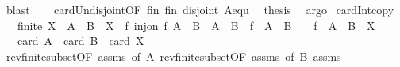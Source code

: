 \begin{isabellebody}
\ blast{\isacharplus}{\kern0pt}\isanewline
\ \ \isamarkupfalse%
\ card{\isacharunderscore}{\kern0pt}Un{\isacharunderscore}{\kern0pt}disjoint{\isacharbrackleft}{\kern0pt}OF\ fin{}\ fin{}\ disjoint{\isacharbrackright}{\kern0pt}\ A{\isacharunderscore}{\kern0pt}equ\ \isamarkupfalse%
\ {\isacharquery}{\kern0pt}thesis\ \isamarkupfalse%
\ argo\isanewline
{}\isamarkupfalse%
%
\endisatagproof
{\isafoldproof}%
%
\isadelimproof
\isanewline
%
\endisadelimproof
\isanewline
{}\isamarkupfalse%
\ card{\isacharunderscore}{\kern0pt}Int{\isacharunderscore}{\kern0pt}copy{\isacharcolon}{\kern0pt}\isanewline
\ \ \ {\isachardoublequoteopen}finite\ X{\isachardoublequoteclose}\ \ {\isachardoublequoteopen}A\ {\isasymunion}\ B\ {\isasymsubseteq}\ X{\isachardoublequoteclose}\ \ {\isachardoublequoteopen}{\isasymexists}f{\isachardot}{\kern0pt}\ inj{\isacharunderscore}{\kern0pt}on\ f\ {\isacharparenleft}{\kern0pt}A\ {\isasyminter}\ B{\isacharparenright}{\kern0pt}\ {\isasymand}\ {\isacharparenleft}{\kern0pt}A\ {\isasymunion}\ B{\isacharparenright}{\kern0pt}\ {\isasyminter}\ {\isacharparenleft}{\kern0pt}f\ {\isacharbackquote}{\kern0pt}\ {\isacharparenleft}{\kern0pt}A\ {\isasyminter}\ B{\isacharparenright}{\kern0pt}{\isacharparenright}{\kern0pt}\ {\isacharequal}{\kern0pt}\ {\isacharbraceleft}{\kern0pt}{\isacharbraceright}{\kern0pt}\ {\isasymand}\ f\ {\isacharbackquote}{\kern0pt}\ {\isacharparenleft}{\kern0pt}A\ {\isasyminter}\ B{\isacharparenright}{\kern0pt}\ {\isasymsubseteq}\ X{\isachardoublequoteclose}\isanewline
\ \ \ {\isachardoublequoteopen}card\ A\ {\isacharplus}{\kern0pt}\ card\ B\ {\isasymle}\ card\ X{\isachardoublequoteclose}\isanewline
%
\isadelimproof
%
\endisadelimproof
%
\isatagproof
{}\isamarkupfalse%
\ {\isacharminus}{\kern0pt}\isanewline
\ \ \isamarkupfalse%
\ rev{\isacharunderscore}{\kern0pt}finite{\isacharunderscore}{\kern0pt}subset{\isacharbrackleft}{\kern0pt}OF\ assms{\isacharparenleft}{\kern0pt}{}{\isacharparenright}{\kern0pt}{\isacharcomma}{\kern0pt}\ of\ A{\isacharbrackright}{\kern0pt}\ rev{\isacharunderscore}{\kern0pt}finite{\isacharunderscore}{\kern0pt}subset{\isacharbrackleft}{\kern0pt}OF\ assms{\isacharparenleft}{\kern0pt}{}{\isacharparenright}{\kern0pt}{\isacharcomma}{\kern0pt}\ of\ B{\isacharbrackright}{\kern0pt}\ assms{\isacharparenleft}{\kern0pt}{}{\isacharparenright}{\kern0pt}\ \isanewline
\ \ \isamarkupfalse%

\end{isabellebody}
